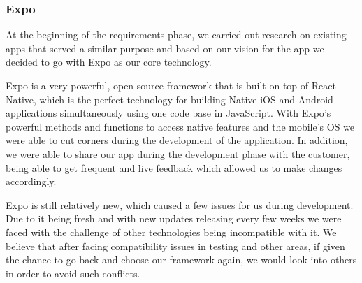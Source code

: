 \documentclass{l3proj}
\begin{document}
\subsubsection{Expo}
At the beginning of the requirements phase, we carried out research on existing apps that served a similar purpose and based on our vision for the app we decided to go with Expo as our core technology.\par
Expo\cite{WEBSITE:expo} is a very powerful, open-source framework that is built on top of React Native, which is the perfect technology for building Native iOS and Android applications simultaneously using one code base in JavaScript. With Expo's powerful methods and functions to access native features and the mobile's OS we were able to cut corners during the development of the application. In addition, we were able to share our app during the development phase with the customer, being able to get frequent and live feedback which allowed us to make changes accordingly. \par
Expo is still relatively new, which caused a few issues for us during development. Due to it being fresh and with new updates releasing every few weeks we were faced with the challenge of other technologies being incompatible with it.  We believe that after facing compatibility issues in testing and other areas, if given the chance to go back and choose our framework again, we would look into others in order to avoid such conflicts.\par
\end{document}
